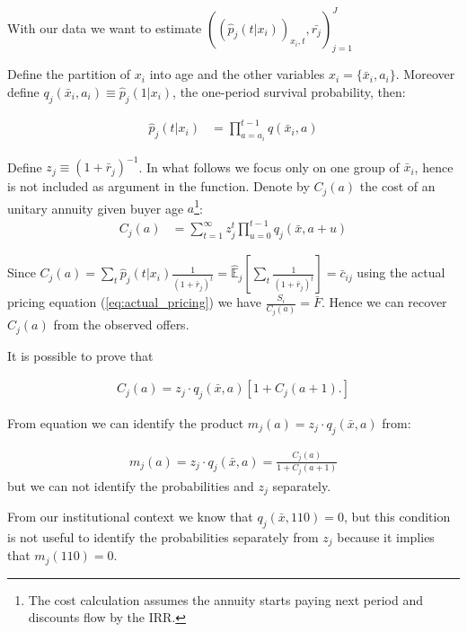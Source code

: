 \documentclass[12pt]{article}
\theoremstyle{plain}
\theoremstyle{plain}
\begin{document}
With our data we want to estimate 
$((\hat{p}_{j}(t|x_{i}))_{x_i,t},  \bar{r_{j}})_{j=1}^J$ 

Define the partition of   $x_{i}$ into age and the other variables $x_{i}=\{\bar{x}_i, a_i\}$. Moreover define $q_{j}(\bar{x}_i, a_i) \equiv \hat{p}_{j}(1|x_i) $, the one-period survival probability, then: 

\begin{align}\label{eq:mort_form}
    \hat{p}_{j}(t|x_i)
    &= \prod_{a= a_i}^{t-1}q(\bar{x}_i, a)
\end{align}

Define $z_j \equiv (1+\bar{r}_j)^{-1}$. In what follows we focus only on one group of $\bar{x}_i$, hence is not included as argument in the function. Denote by $C_j(a)$ the  cost of an unitary annuity given buyer age $a$\footnote{The cost calculation assumes the annuity starts paying next period and discounts flow by the IRR.}: 
\begin{align}\label{eq:ident_costs}
    C_j(a) &= \sum_{t=1}^{\infty} z_j^t \prod_{u=0}^{t-1} q_j(\bar{x}, a+u) 
\end{align}

Since $C_j(a) =\sum_{t}\hat{p}_{j}(t|x_{i}) \frac{1}{(1+\bar{r}_{j})^{t}} = \hat{\mathbb{E}}_{j}\left[\sum_{t}\frac{1}{(1+\bar{r}_{j})^{t}}\right] = \bar{c}_{ij}$ using the  actual pricing equation (\ref{eq:actual_pricing}) we have  $\frac{S_i}{C_j(a)} = \bar{F}$. Hence we can recover $C_j(a)$ from the observed offers.


It is possible to prove that 


\begin{align}\label{eq:identification1}
    C_j(a) = z_j \cdot q_j(\bar{x}, a)[1+C_j(a+1).]
\end{align}

From equation \label{eq:identification1} we can identify the product $m_j(a) = z_j\cdot q_j(\bar{x}, a)$ from: 

\begin{align}\label{eq:identification2}
     m_j(a) =z_j \cdot q_j(\bar{x}, a)=\frac{C_j(a)}{1+C_j(a+1)}
\end{align}
but we can not identify the probabilities and $z_j$ separately.




From our institutional context we know  that   $ q_j(\bar{x},110) =0$, but this condition is not useful to identify the probabilities separately from $z_j$ because it implies that $m_j(110) =0$. 
\end{document}
